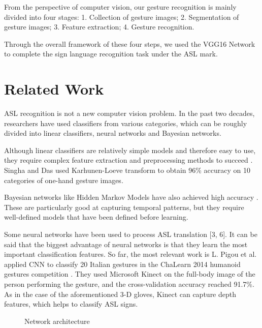 \documentclass[10pt,twocolumn,letterpaper]{article}
\begin{document}
From the perspective of computer vision, our gesture recognition is mainly divided into four stages: 1. Collection of gesture images; 2. Segmentation of gesture images; 3. Feature extraction; 4. Gesture recognition.

Through the overall framework of these four steps, we used the VGG16 Network to complete the sign language recognition task under the ASL mark.






\section{Related Work}

ASL recognition is not a new computer vision problem. In the past two decades, researchers have used classifiers from various categories, which can be roughly divided into linear classifiers, neural networks and Bayesian networks.

Although linear classifiers are relatively simple models and therefore easy to use, they require complex feature extraction and preprocessing methods to succeed \cite{singha2013hand} \cite{aryanie2015american}. Singha and Das used Karhunen-Loeve transform \cite{atwood2012american} to obtain 96\% accuracy on 10 categories of one-hand gesture images.

Bayesian networks like Hidden Markov Models have also achieved high accuracy \cite{starner1997real} \cite{jebali2013extension}. These are particularly good at capturing temporal patterns, but they require well-defined models that have been defined before learning.

Some neural networks have been used to process ASL translation [3, 6]. It can be said that the biggest advantage of neural networks is that they learn the most important classification features. So far, the most relevant work is L. Pigou et al. applied CNN to classify 20 Italian gestures in the ChaLearn 2014 humanoid gestures competition \cite{pigou2014sign}. They used Microsoft Kinect on the full-body image of the person performing the gesture, and the cross-validation accuracy reached 91.7\%. As in the case of the aforementioned 3-D gloves, Kinect can capture depth features, which helps to classify ASL signs.


\begin{figure}[ht]
\begin{center}
\fbox{\rule{0pt}{2in} \rule{.9\linewidth}{0pt}}
\end{center}
   \caption{Network architecture}
\label{fig:arch}
\end{figure}
\end{document}
